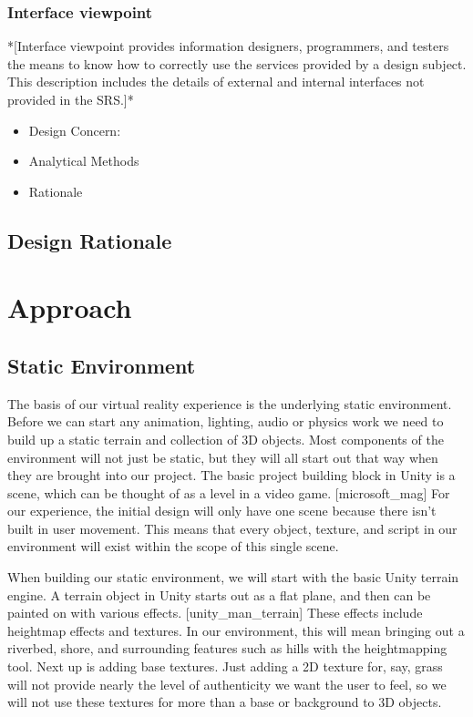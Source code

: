 \documentclass[10pt,journal,compsoc,onecolumn, draftclsnofoot]{IEEEtran}
\begin{document}
\subsubsection{Interface viewpoint}
*[Interface viewpoint provides information designers, programmers, and testers the means to know how to correctly use the services provided by a design subject. This description includes the details of external and internal interfaces not provided in the SRS.]*
\begin{itemize}
  \item Design Concern:
  \item Analytical Methods
  \item Rationale
\end{itemize}


\subsection{Design Rationale}



\section{Approach}
\subsection{Static Environment}
The basis of our virtual reality experience is the underlying static
environment. Before we can start any animation, lighting, audio or physics
work we need to build up a static terrain and collection of 3D objects.
Most components of the environment will not just be static, but they will all
start out that way when they are brought into our project. The basic project
building block in Unity is a scene, which can be thought of as a level in a
video game. [microsoft\_mag] For our experience, the initial design will
only have one scene because there isn't built in user movement. This means that
every object, texture, and script in our environment will exist within the
scope of this single scene.

When building our static environment, we will start with the basic Unity
terrain engine. A terrain object in Unity starts out as a flat plane, and then
can be painted on with various effects. [unity\_man\_terrain] These effects
include heightmap effects and textures. In our environment, this will mean
bringing out a riverbed, shore, and surrounding features such as hills with the
heightmapping tool. Next up is adding base textures. Just adding a 2D texture
for, say, grass will not provide nearly the level of authenticity we want the
user to feel, so we will not use these textures for more than a base or
background to 3D objects. 
\end{document}
